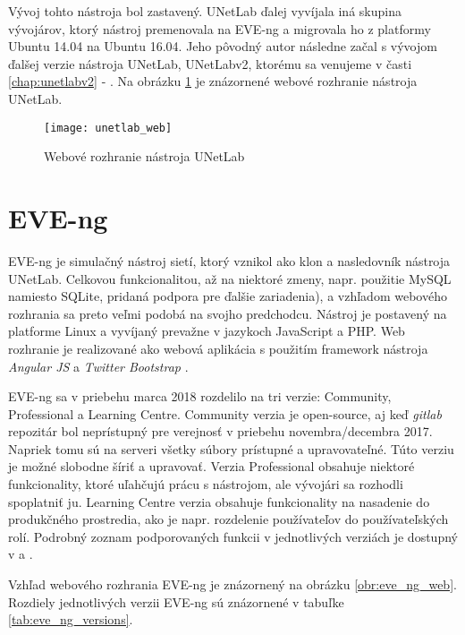 Vývoj tohto nástroja bol zastavený. UNetLab ďalej vyvíjala iná skupina vývojárov, ktorý nástroj premenovala na EVE-ng a migrovala ho z platformy Ubuntu 14.04 na Ubuntu 16.04. Jeho pôvodný autor následne začal s vývojom ďalšej verzie nástroja UNetLab, UNetLabv2, ktorému sa venujeme v časti \ref{chap:unetlabv2} - . Na obrázku \ref{obr:unetlab_web} je znázornené webové rozhranie nástroja UNetLab.

\begin{figure}
    \centering
    \texttt{[image: unetlab\_web]}
    \caption{Webové rozhranie nástroja UNetLab}
    \cite{obr_unetlab_web}
    \label{obr:unetlab_web}
\end{figure}





\section{EVE-ng}
\label{chap:virt_lab_eve_ng}

EVE-ng je simulačný nástroj sietí, ktorý vznikol ako klon a nasledovník nástroja UNetLab. Celkovou funkcionalitou, až na niektoré zmeny, napr. použitie MySQL namiesto SQLite, pridaná podpora pre ďalšie zariadenia), a vzhľadom webového rozhrania sa preto veľmi podobá na svojho predchodcu. Nástroj je postavený na platforme Linux a vyvíjaný prevažne v jazykoch JavaScript a PHP. Web rozhranie je realizované ako webová aplikácia s použitím framework nástroja \emph{Angular JS} a \emph{Twitter Bootstrap} \cite{eve_ng_technologies}.

EVE-ng sa v priebehu marca 2018 rozdelilo na tri verzie: Community, Professional a Learning Centre. Community verzia je open-source, aj keď \emph{gitlab} repozitár bol neprístupný pre verejnosť v priebehu novembra/decembra 2017. Napriek tomu sú na serveri všetky súbory prístupné a upravovateľné. Túto verziu je možné slobodne šíriť a upravovať. Verzia Professional obsahuje niektoré funkcionality, ktoré uľahčujú prácu s nástrojom, ale vývojári sa rozhodli spoplatniť ju. Learning Centre verzia obsahuje funkcionality na nasadenie do produkčného prostredia, ako je napr. rozdelenie používateľov do používateľských rolí. Podrobný zoznam podporovaných funkcii v jednotlivých verziách je dostupný v \cite{eve_ng_versions_table} a \cite{eve_ng_versions_list}.

Vzhľad webového rozhrania EVE-ng je znázornený na obrázku \ref{obr:eve_ng_web}. Rozdiely jednotlivých verzii EVE-ng sú znázornené v tabuľke \ref{tab:eve_ng_versions}.

